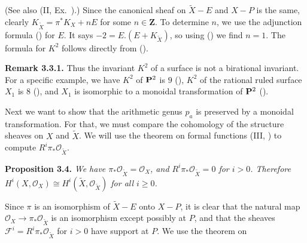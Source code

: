 {\Proof (See also (II, Ex.~).) Since the canonical sheaf on $\widetilde X-E$ and $X-P$ is the same, clearly $K_{\widetilde X}=\pi^*K_X+nE$ for some $n\in\mathbf Z$. To determine $n$, we use the adjunction formula () for $E$. It says $-2=E.(E+K_{\widetilde X})$, so using () we find $n=1$. The formula for $K^2$ follows directly from ().

\medskip
\noindent\hypertarget{result-V-3.3.1}{}\textbf{Remark 3.3.1.} Thus the invariant $K^2$ of a surface is not a birational invariant. For a specific example, we have $K^2$ of $\mathbf{P}^2$ is $9$ (), $K^2$ of the rational ruled surface $X_1$ is $8$ (), and $X_1$ is isomorphic to a monoidal transformation of $\mathbf{P}^2$ ().

\smallskip
Next we want to show that the arithmetic genus $p_a$ is preserved by a monoidal transformation. For that, we must compare the cohomology of the structure sheaves on $X$ and $\widetilde X$. We will use the theorem on formal functions (III, ) to compute $R^i\pi_*\mathcal O_{\widetilde X}$.

\medskip
\noindent\hypertarget{result-V-3.4}{}\textbf{Proposition 3.4.} \emph{We have $\pi_*\mathcal O_{\widetilde X}=\mathcal O_X$, and $R^i\pi_*\mathcal O_{\widetilde X}=0$ for $i>0$. Therefore $H^i(X,\mathcal O_X)\cong H^i(\widetilde X,\mathcal O_{\widetilde X})$ for all $i\ge0$.}

\Proof Since $\pi$ is an isomorphism of $\widetilde X-E$ onto $X-P$, it is clear that the natural map $\mathcal O_X\to\pi_*\mathcal O_{\widetilde X}$ is an isomorphism except possibly at $P$, and that the sheaves $\mathcal F^i=R^i\pi_*\mathcal O_{\widetilde X}$ for $i>0$ have support at $P$. We use the theorem on
}
